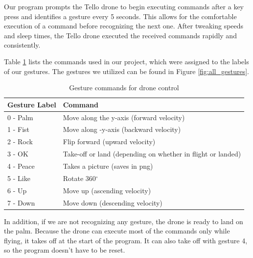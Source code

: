 Our program prompts the Tello drone to begin executing commands after a key press and identifies a gesture every 5 seconds. This allows for the comfortable execution of a command before recognizing the next one. After tweaking speeds and sleep times, the Tello drone executed the received commands rapidly and consistently.

Table \ref{tab:gesture_commands} lists the commands used in our project, which were assigned to the labels of our gestures. The gestures we utilized can be found in Figure \ref{fig:all_gestures}.

\begin{table}[ht]
	\centering
	\begin{tabular}{ll}
		\toprule
		Gesture Label & Command \\
		\midrule
		0 - Palm& Move along the y-axis (forward velocity) \\
		1 - Fist& Move along -y-axis (backward velocity) \\
		2 - Rock& Flip forward (upward velocity) \\
		3 - OK & Take-off or land (depending on whether in flight or landed) \\
		4 - Peace& Takes a picture (saves in png) \\
		5 - Like& Rotate 360$^\circ$ \\
		6 - Up& Move up (ascending velocity) \\
		7 - Down & Move down (descending velocity)\\
		\bottomrule
	\end{tabular}
	\caption{Gesture commands for drone control}
	\label{tab:gesture_commands}
\end{table}



In addition, if we are not recognizing any gesture, the drone is ready to land on the palm. Because the drone can execute most of the commands only while flying, it takes off at the start of the program. It can also take off with gesture 4, so the program doesn't have to be reset.






